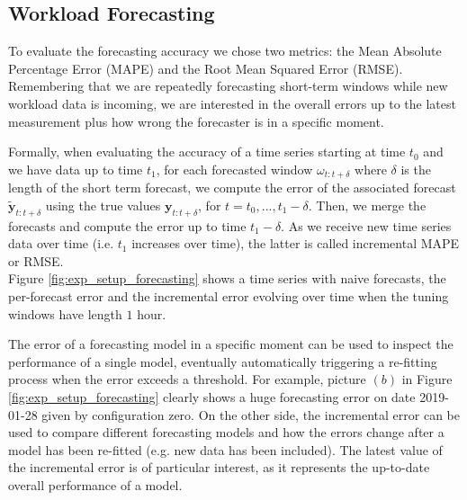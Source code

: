\documentclass[a4paper, 12pt]{article} %
\begin{document}
	\subsection{Workload Forecasting } \label{ssec:exp_workload_forecasting}
	To evaluate the forecasting accuracy we chose two metrics: the Mean Absolute Percentage Error (MAPE) and the Root Mean Squared Error (RMSE).  Remembering that we are repeatedly forecasting short-term windows while new workload data is incoming, we are interested in the overall errors up to the latest measurement plus how wrong the forecaster is in a specific moment.
	
	Formally, when evaluating the accuracy of a time series starting at time $t_0$ and we have data up to time $t_1$, for each forecasted window $\omega_{t:t+\delta}$ where $\delta$ is the length of the short term forecast, we compute the error of the associated forecast $\tilde{\pmb{y}}_{t:t+\delta}$ using the true values $\pmb{y}_{t:t+\delta}$, for $t=t_0, ..., t_1 - \delta$. Then, we merge the forecasts and compute the error up to time $t_1 - \delta$. As we receive new time series data over time (i.e. $t_1$ increases over time), the latter is called incremental MAPE or RMSE. \\
	Figure \ref{fig:exp_setup_forecasting} shows a time series with naive forecasts, the per-forecast error and the incremental error evolving over time when the tuning windows have length $1$ hour.
	
	The error of a forecasting model in a specific moment can be used to inspect the performance of a single model, eventually automatically triggering a re-fitting process when the error exceeds a threshold. For example, picture $(b)$ in Figure \ref{fig:exp_setup_forecasting} clearly shows a huge forecasting error on date 2019-01-28 given by configuration zero. On the other side, the incremental error can be used to compare different forecasting models and how the errors change after a model has been re-fitted (e.g. new data has been included). The latest value of the incremental error is of particular interest, as it represents the up-to-date overall performance of a model.
	
\end{document}
